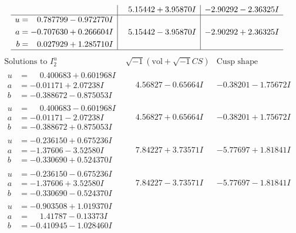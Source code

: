\documentclass[1p]{elsarticle_modified}
\theoremstyle{definition}
\newcommand{\I}{\sqrt{-1}}
\begin{document}
$$\begin{array}{c|c|c}
 & \phantom{-}5.15442 + 3.95870 I & -2.90292 - 2.36325 I \\ \hline\begin{aligned}
u &= \phantom{-}0.787799 - 0.972770 I \\
a &= -0.707630 + 0.266604 I \\
b &= \phantom{-}0.027929 + 1.285710 I\end{aligned}
 & \phantom{-}5.15442 - 3.95870 I & -2.90292 + 2.36325 I\\
 \hline 
 \end{array}$$\newpage$$\begin{array}{c|c|c}  
\text{Solutions to }I^u_{2}& \I (\text{vol} + \sqrt{-1}CS) & \text{Cusp shape}\\
 \hline 
\begin{aligned}
u &= \phantom{-}0.400683 + 0.601968 I \\
a &= -0.01171 + 2.07238 I \\
b &= -0.388672 - 0.875053 I\end{aligned}
 & \phantom{-}4.56827 - 0.65664 I & -0.38201 - 1.75672 I \\ \hline\begin{aligned}
u &= \phantom{-}0.400683 - 0.601968 I \\
a &= -0.01171 - 2.07238 I \\
b &= -0.388672 + 0.875053 I\end{aligned}
 & \phantom{-}4.56827 + 0.65664 I & -0.38201 + 1.75672 I \\ \hline\begin{aligned}
u &= -0.236150 + 0.675236 I \\
a &= -1.37606 - 3.52580 I \\
b &= -0.330690 + 0.524370 I\end{aligned}
 & \phantom{-}7.84227 + 3.73571 I & -5.77697 + 1.81841 I \\ \hline\begin{aligned}
u &= -0.236150 - 0.675236 I \\
a &= -1.37606 + 3.52580 I \\
b &= -0.330690 - 0.524370 I\end{aligned}
 & \phantom{-}7.84227 - 3.73571 I & -5.77697 - 1.81841 I \\ \hline\begin{aligned}
u &= -0.903508 + 1.019370 I \\
a &= \phantom{-}1.41787 - 0.13373 I \\
b &= -0.410945 - 1.028460 I\end{aligned}

\end{array}$$
\end{document}
